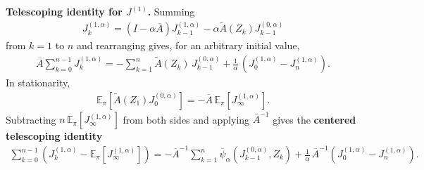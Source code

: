 \textbf{Telescoping identity for \(J^{(1)}\).} Summing
\begin{equation}
\begin{aligned}
J_k^{(1,\alpha)}
  = (I-\alpha\overline{A})J_{k-1}^{(1,\alpha)}
    -\alpha\widetilde{A}(Z_k)J_{k-1}^{(0,\alpha)}
\end{aligned}
\end{equation}
from \(k = 1\) to \(n\) and rearranging gives, for an arbitrary initial value,
\begin{equation}
\begin{aligned}
\overline{A} \sum_{k = 0}^{n - 1} J_k^{(1, \alpha)}
  = -\sum_{k = 1}^n \widetilde{A}(Z_k) \, J_{k - 1}^{(0, \alpha)}
    + \frac{1}{\alpha} \, \left(J_0^{(1, \alpha)} - J_n^{(1, \alpha)}\right).
\end{aligned}
\end{equation}
In stationarity,
\begin{equation}
\begin{aligned}
\mathbb{E}_\pi\!\left[\widetilde{A}(Z_1)J_0^{(0,\alpha)}\right]
  = -\overline{A}\,\mathbb{E}_\pi\!\left[J_\infty^{(1,\alpha)}\right].
\end{aligned}
\end{equation}
Subtracting \(n \, \mathbb{E}_\pi [J_\infty^{(1, \alpha)}]\) from both sides and
applying \(\overline{A}^{-1}\) gives the \textbf{centered telescoping identity}
\begin{equation}
\begin{aligned}
\sum_{k = 0}^{n - 1} \left(J_k^{(1, \alpha)} - \mathbb{E}_\pi [J_\infty^{(1, \alpha)}]\right)
  = -\overline{A}^{-1} \sum_{k = 1}^n
      \overline{\psi}_\alpha (J_{k - 1}^{(0, \alpha)}, Z_k)
    + \frac{1}{\alpha} \, \overline{A}^{-1}
      \left(J_0^{(1, \alpha)} - J_n^{(1, \alpha)}\right).
\end{aligned}
\label{eq:J1-telescope}
\end{equation}

